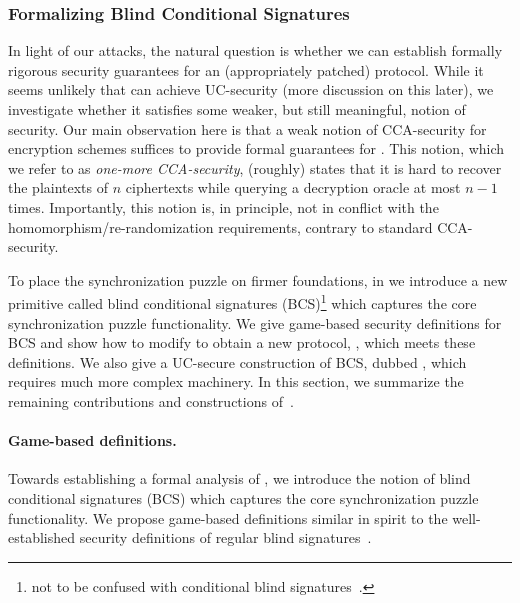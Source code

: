 \subsubsection{Formalizing Blind Conditional Signatures}\label{sec:bcs}

In light of our attacks, the natural question is whether we can establish formally rigorous security guarantees for an (appropriately patched) \AAL protocol. While it seems unlikely that \AAL can achieve UC-security (more discussion on this later), we investigate whether it satisfies some weaker, but still meaningful, notion of security. Our main observation here is that a weak notion of CCA-security for encryption schemes suffices to provide formal guarantees for \AAL. This notion, which we refer to as \emph{one-more CCA-security}, (roughly) states that it is hard to recover the plaintexts of $n$ ciphertexts while querying a decryption oracle at most $n-1$ times. Importantly, this notion is, in principle, not in conflict with the homomorphism/re-randomization requirements, contrary to standard CCA-security.

To place the synchronization puzzle on firmer foundations, in \cite{CCS:GMMMTT22} we introduce a new primitive called blind conditional signatures (BCS)\footnote{not to be confused with conditional blind signatures~\cite{EPRINT:ZacGroPag17}.} which captures the core synchronization puzzle functionality. We give game-based security definitions for BCS and show how to modify \AAL to obtain a new protocol, \AALplus, which meets these definitions. We also give a UC-secure construction of BCS, dubbed \AALUC, which requires much more complex machinery. In this section, we summarize the remaining contributions and constructions of~\cite{CCS:GMMMTT22}. 

\paragraph{Game-based definitions.} Towards establishing a formal analysis of \AAL, we introduce the notion of blind conditional signatures (BCS) which captures the core synchronization puzzle functionality. We propose game-based definitions similar in spirit to the well-established security definitions of regular blind signatures~\cite{C:Chaum82,JC:SchUnr17}. 

